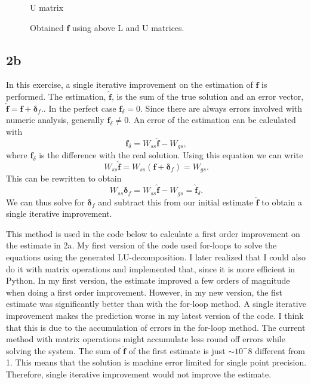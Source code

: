 \begin{figure}[h!]
    \centering
    
    \caption{U matrix}
    \label{fig:2a_U}
\end{figure}

\begin{figure}[h!]
    \centering
    
    \caption{Obtained $\mathbf{f}$ using above L and U matrices.}
    \label{fig:2a_f}
\end{figure}

\newpage

\subsection*{2b}
In this exercise, a single iterative improvement on the estimation of $\mathbf{f}$ is performed. The estimation, $\hat{\mathbf{f}}$, is the sum of the true solution and an error vector, $\hat{\mathbf{f}} = \mathbf{f} + \mathbf{\delta}_f.$. In the perfect case $\mathbf{f}_\delta=0$. Since there are always errors involved with numeric analysis, generally $\mathbf{f}_\delta\neq 0$. An error of the estimation can be calculated with
\begin{equation}
    \mathbf{f}_\delta = W_{ss}\mathbf{\hat{f}} - W_{gs},
\end{equation}
where $\mathbf{f}_\delta$ is the difference with the real solution. Using this equation we can write
\begin{equation}
    W_{ss}\hat{\mathbf{f}} = W_{ss}(\mathbf{f} + \mathbf{\delta}_f) = W_{gs}.
\end{equation}
This can be rewritten to obtain
\begin{equation}
    W_{ss}\mathbf{\delta}_f = W_{ss}\mathbf{\hat{f}} - W_{gs} = \hat{\mathbf{f}}_\delta.
\end{equation}
We can thus solve for $\mathbf{\delta}_f$ and subtract this from our initial estimate $\hat{\mathbf{f}}$ to obtain a single iterative improvement.

This method is used in the code below to calculate a first order improvement on the estimate in 2a. My first version of the code used for-loops to solve the equations using the generated LU-decomposition. I later realized that I could also do it with matrix operations and implemented that, since it is more efficient in Python. In my first version, the estimate improved a few orders of magnitude when doing a first order improvement. However, in my new version, the fist estimate was significantly better than with the for-loop method. A single iterative improvement makes the prediction worse in my latest version of the code. I think that this is due to the accumulation of errors in the for-loop method. The current method with matrix operations might accumulate less round off errors while solving the system. The sum of $\hat{\mathbf{f}}$ of the first estimate is just $\sim 10^-8$ different from 1. This means that the solution is machine error limited for single point precision. Therefore, single iterative improvement would not improve the estimate.

